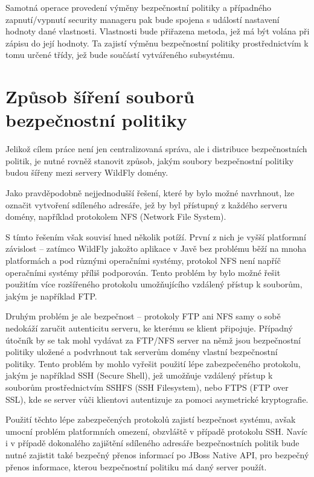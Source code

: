 Samotná operace provedení výměny bezpečnostní politiky a případného zapnutí/vypnutí security manageru pak bude spojena s událostí nastavení hodnoty dané vlastnosti. Vlastnosti bude přiřazena metoda, jež má být volána při zápisu do její hodnoty. Ta zajistí výměnu bezpečnostní politiky prostřednictvím k tomu určené třídy, jež bude součástí vytvářeného subsystému.

\section{Způsob šíření souborů bezpečnostní politiky} \label{sireniSouboru}

Jelikož cílem práce není jen centralizovaná správa, ale i distribuce bezpečnostních politik, je nutné rovněž stanovit způsob, jakým soubory bezpečnostní politiky budou šířeny mezi servery WildFly domény.

Jako pravděpodobně nejjednodušší řešení, které by bylo možné navrhnout, lze označit vytvoření sdíleného adresáře, jež by byl přístupný z každého serveru domény, například protokolem NFS (Network File System).

S tímto řešením však souvisí hned několik potíží. První z nich je vyšší platformní závislost -- zatímco WildFly jakožto aplikace v Javě bez problému běží na mnoha platformách a pod různými operačními systémy, protokol NFS není napříč operačními systémy příliš podporován. Tento problém by bylo možné řešit použitím více rozšířeného protokolu umožňujícího vzdálený přístup k souborům, jakým je například FTP.

Druhým problém je ale bezpečnost -- protokoly FTP ani NFS samy o sobě nedokáží zaručit autenticitu serveru, ke kterému se klient připojuje. Případný útočník by se tak mohl vydávat za FTP/NFS server na němž jsou bezpečnostní politiky uložené a podvrhnout tak serverům domény vlastní bezpečnostní politiky. Tento problém by mohlo vyřešit použití lépe zabezpečeného protokolu, jakým je například SSH (Secure Shell), jež umožňuje vzdálený přístup k souborům prostřednictvím SSHFS (SSH Filesystem), nebo FTPS (FTP over SSL), kde se server vůči klientovi autentizuje za pomoci asymetrické kryptografie. \cite[3]{ssh}

Použití těchto lépe zabezpečených protokolů zajistí bezpečnost systému, avšak umocní problém platformních omezení, obzvláště v případě protokolu SSH. Navíc i v případě dokonalého zajištění sdíleného adresáře bezpečnostních politik bude nutné zajistit také bezpečný přenos informací po JBoss Native API, pro bezpečný přenos informace, kterou bezpečnostní politiku má daný server použít.

